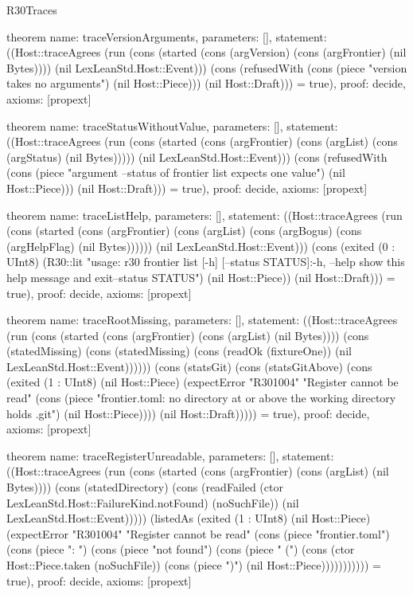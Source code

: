 \begin{lexlean}{R30Traces}
\begin{semanticmodule}
theorem{
  name: traceVersionArguments,
  parameters: [],
  statement: ((Host::traceAgrees (run (cons (started (cons (argVersion) (cons (argFrontier) (nil Bytes)))) (nil LexLeanStd.Host::Event))) (cons (refusedWith (cons (piece "version takes no arguments") (nil Host::Piece))) (nil Host::Draft))) = true),
  proof: decide{},
  axioms: [propext]
}

theorem{
  name: traceStatusWithoutValue,
  parameters: [],
  statement: ((Host::traceAgrees (run (cons (started (cons (argFrontier) (cons (argList) (cons (argStatus) (nil Bytes))))) (nil LexLeanStd.Host::Event))) (cons (refusedWith (cons (piece "argument --status of frontier list expects one value") (nil Host::Piece))) (nil Host::Draft))) = true),
  proof: decide{},
  axioms: [propext]
}

theorem{
  name: traceListHelp,
  parameters: [],
  statement: ((Host::traceAgrees (run (cons (started (cons (argFrontier) (cons (argList) (cons (argBogus) (cons (argHelpFlag) (nil Bytes)))))) (nil LexLeanStd.Host::Event))) (cons (exited (0 : UInt8) (R30::lit "usage: r30 frontier list [-h] [--status STATUS]\n\noptions:\n  -h, --help       show this help message and exit\n  --status STATUS\n") (nil Host::Piece)) (nil Host::Draft))) = true),
  proof: decide{},
  axioms: [propext]
}

theorem{
  name: traceRootMissing,
  parameters: [],
  statement: ((Host::traceAgrees (run (cons (started (cons (argFrontier) (cons (argList) (nil Bytes)))) (cons (statedMissing) (cons (statedMissing) (cons (readOk (fixtureOne)) (nil LexLeanStd.Host::Event)))))) (cons (statsGit) (cons (statsGitAbove) (cons (exited (1 : UInt8) (nil Host::Piece) (expectError "R301004" "Register cannot be read" (cons (piece "frontier.toml: no directory at or above the working directory holds .git") (nil Host::Piece)))) (nil Host::Draft))))) = true),
  proof: decide{},
  axioms: [propext]
}

theorem{
  name: traceRegisterUnreadable,
  parameters: [],
  statement: ((Host::traceAgrees (run (cons (started (cons (argFrontier) (cons (argList) (nil Bytes)))) (cons (statedDirectory) (cons (readFailed (ctor LexLeanStd.Host::FailureKind.notFound) (noSuchFile)) (nil LexLeanStd.Host::Event))))) (listedAs (exited (1 : UInt8) (nil Host::Piece) (expectError "R301004" "Register cannot be read" (cons (piece "frontier.toml") (cons (piece ": ") (cons (piece "not found") (cons (piece " (") (cons (ctor Host::Piece.taken (noSuchFile)) (cons (piece ")") (nil Host::Piece))))))))))) = true),
  proof: decide{},
  axioms: [propext]
}


\end{semanticmodule}
\end{lexlean}
